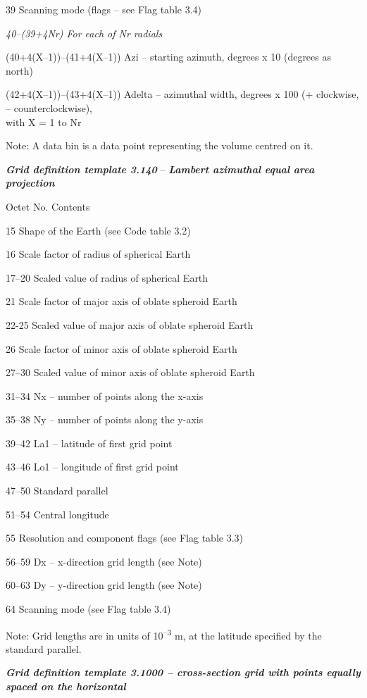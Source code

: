 39 Scanning mode (flags -- see Flag table 3.4)

\emph{40--(39+4Nr) For each of Nr radials}

(40+4(X--1))--(41+4(X--1)) Azi -- starting azimuth, degrees x 10 (degrees as north)

(42+4(X--1))--(43+4(X--1)) Adelta -- azimuthal width, degrees x 100 (+ clockwise, -- counterclockwise),\\
with X = 1 to Nr

Note: A data bin is a data point representing the volume centred on it.

\emph{\textbf{Grid definition template 3.140}} -- \emph{\textbf{Lambert azimuthal equal area projection}}

Octet No. Contents

15 Shape of the Earth (see Code table 3.2)

16 Scale factor of radius of spherical Earth

17--20 Scaled value of radius of spherical Earth

21 Scale factor of major axis of oblate spheroid Earth

22-25 Scaled value of major axis of oblate spheroid Earth

26 Scale factor of minor axis of oblate spheroid Earth

27--30 Scaled value of minor axis of oblate spheroid Earth

31--34 Nx -- number of points along the x-axis

35--38 Ny -- number of points along the y-axis

39--42 La1 -- latitude of first grid point

43--46 Lo1 -- longitude of first grid point

47--50 Standard parallel

51--54 Central longitude

55 Resolution and component flags (see Flag table 3.3)

56--59 Dx -- x-direction grid length (see Note)

60--63 Dy -- y-direction grid length (see Note)

64 Scanning mode (see Flag table 3.4)

Note: Grid lengths are in units of 10\textsuperscript{--3} m, at the latitude specified by the standard parallel.

\emph{\textbf{Grid definition template 3.1000 -- cross-section grid with points equally spaced on the horizontal}}

